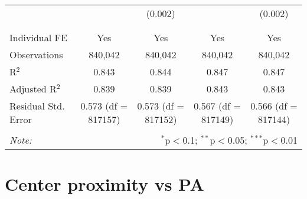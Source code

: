 \documentclass[
]{article}
\begin{document}
\begin{table}[!htbp]
{\begin{tabular}{@{\extracolsep{5pt}}lcccc}
  &  & (0.002) &  & (0.002) \\ 
  & & & & \\ 
\hline \\[-1.8ex] 
Individual FE & Yes & Yes & Yes & Yes \\ 
Observations & 840,042 & 840,042 & 840,042 & 840,042 \\ 
R$^{2}$ & 0.843 & 0.844 & 0.847 & 0.847 \\ 
Adjusted R$^{2}$ & 0.839 & 0.839 & 0.843 & 0.843 \\ 
Residual Std. Error & 0.573 (df = 817157) & 0.573 (df = 817152) & 0.567 (df = 817149) & 0.566 (df = 817144) \\ 
\hline 
\hline \\[-1.8ex] 
\textit{Note:}  & \multicolumn{4}{r}{$^{*}$p$<$0.1; $^{**}$p$<$0.05; $^{***}$p$<$0.01} \\ 
\end{tabular}
} 
\end{table} 
\newpage
\section{Center proximity vs PA}
\end{document}
